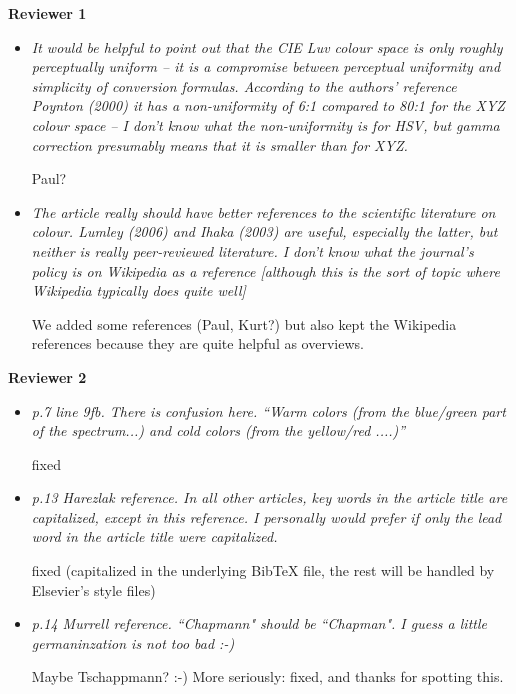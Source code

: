 \documentclass[a4paper]{article}
\begin{document}
\textbf{Reviewer 1}

\begin{itemize}
  \item \textit{It would be helpful to point out that the CIE Luv colour
        space is only roughly perceptually uniform -- it is a compromise
	between perceptual uniformity and simplicity of conversion formulas.
	According to the authors' reference Poynton (2000) it has a non-uniformity
	of 6:1 compared to 80:1 for the XYZ colour space -- I don't know what the
	non-uniformity is for HSV, but gamma correction presumably means that it
	is smaller than for XYZ.}

        Paul?
	
  \item \textit{The article really should have better references to the scientific
        literature on colour. Lumley (2006) and Ihaka (2003) are useful, especially
        the latter, but neither is really peer-reviewed literature.  I don't know
        what the journal's policy is on Wikipedia as a reference [although this is
        the sort of topic where Wikipedia typically does quite well]}
	
	We added some references (Paul, Kurt?) but also kept the Wikipedia
	references because they are quite helpful as overviews.
\end{itemize}


\textbf{Reviewer 2}

\begin{itemize}
  \item \textit{p.7 line 9fb. There is confusion here. ``Warm colors
        (from the blue/green part of the spectrum...) and cold colors
	(from the yellow/red ....)''}
	
	fixed
	
  \item \textit{p.13 Harezlak reference. In all other articles, key words in the article
        title are capitalized, except in this reference. I personally would prefer
        if only the lead word in the article title were capitalized.}
	
	fixed (capitalized in the underlying {\sc Bib}{\TeX} file, the rest
	will be handled by Elsevier's style files)
	
  \item \textit{p.14 Murrell reference. ``Chapmann" should be ``Chapman". I guess a little
        germaninzation is not too bad :-)}
	
	Maybe Tschappmann? :-) More seriously: fixed, and thanks for spotting this.
\end{itemize}
\end{document}
